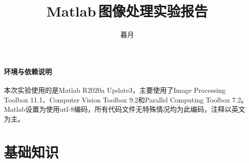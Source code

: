 \documentclass[10pt, a4paper]{article}
\begin{document}

\title{Matlab\,图像处理实验报告}
\author{暮月}

\maketitle

\tableofcontents

\paragraph{环境与依赖说明}本次实验使用的是Matlab R2020a Update3，主要使用了Image Processing Toolbox 11.1、Computer Vision Toolbox 9.2和Parallel Computing Toolbox 7.2。Matlab设置为使用utf-8编码，所有代码文件无特殊情况均为此编码，注释以英文为主。

\section{基础知识}
\end{document}
